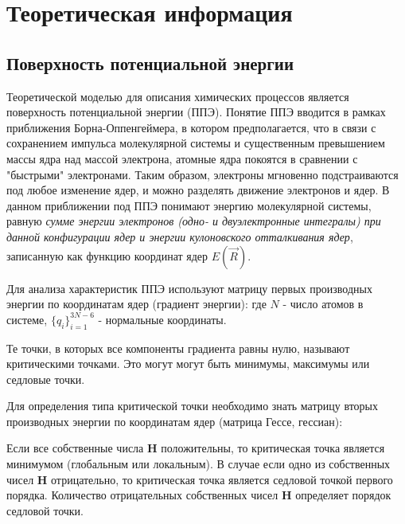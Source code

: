 \section{Теоретическая информация}
\subsection{Поверхность потенциальной энергии}
Теоретической моделью для описания химических процессов является поверхность потенциальной энергии (ППЭ). Понятие ППЭ вводится в рамках приближения Борна-Оппенгеймера, в котором предполагается, что в связи с сохранением импульса молекулярной системы и существенным превышением массы ядра над массой электрона, атомные ядра покоятся в сравнении с "быстрыми" электронами. Таким образом, электроны мгновенно подстраиваются под любое изменение ядер, и можно разделять движение электронов и ядер. В данном приближении под ППЭ понимают энергию молекулярной системы, равную \textit{сумме энергии электронов (одно- и двуэлектронные интегралы) при данной конфигурации ядер и энергии кулоновского отталкивания ядер}, записанную как функцию координат ядер $E(\vec{R})$. 

Для анализа характеристик ППЭ используют матрицу первых производных энергии по координатам ядер (градиент энергии):
где $N$ - число атомов в системе, $\{q_i\}_{i=1}^{3N-6}$ - нормальные координаты.

Те точки, в которых все компоненты градиента равны нулю, называют критическими точками. Это могут могут быть минимумы, максимумы или седловые точки. 

Для определения типа критической точки необходимо знать матрицу вторых производных энергии по координатам ядер (матрица Гессе, гессиан):

Если все собственные числа \textbf{H} положительны, то критическая точка является минимумом (глобальным или локальным). В случае если одно из собственных чисел \textbf{H} отрицательно, то критическая точка является седловой точкой первого порядка. Количество отрицательных собственных чисел \textbf{H} определяет порядок седловой точки.

